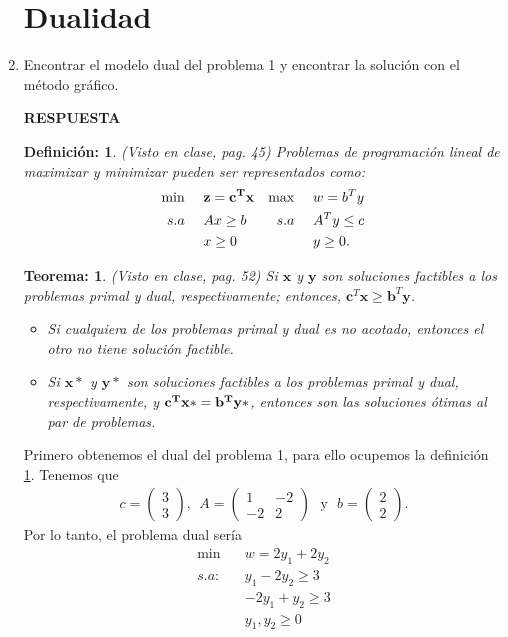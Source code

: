 \documentclass[11pt,letterpaper]{article}
\newcommand{\x}{\mathbf{x}}
\newcommand{\res}{\textbf{RESPUESTA}\\}
\newtheorem{thmt}{Teorema:}
\newtheorem{thmd}{Definición:}
\begin{document}
\begin{enumerate}
\section{Dualidad}

\item Encontrar el modelo  dual del problema 1 y encontrar la solución con el método gráfico.

\res \begin{framed}
    \begin{thmd} \label{d_dual}
	(Visto en clase, pag. 45) Problemas de programación lineal de maximizar y minimizar pueden ser representados como:
	\begin{align*}
	\min\ \ \ \ & \bf z=c^T \x &  \max\ \ \ \ & w=b^Ty\\
	s.a\ \ \ \ & Ax\geq b &  s.a\ \ \ \ & A^T y\leq c\\
	& x\geq 0 & &  y\geq 0.
	\end{align*}
    \end{thmd}
\end{framed}
\begin{framed}
    \begin{thmt} \label{t_dual_debil}
	(Visto en clase, pag. 52) Si $\x$ y $\mathbf{y}$ son soluciones factibles a los problemas primal y dual, respectivamente; entonces, $\mathbf{c}^T \x \geq \mathbf{b}^T \mathbf{y}$.
	\begin{itemize}
	\item Si cualquiera de los problemas primal y dual es no acotado, entonces el otro no tiene solución factible.
	\item Si $\x*$ y $\mathbf{y}*$  son soluciones factibles a los problemas primal y dual, respectivamente, y $\bf c^T x*=b^Ty*$, entonces son las soluciones ótimas al par de problemas. 
	\end{itemize}
    \end{thmt}
\end{framed}


Primero obtenemos el dual del problema 1, para ello ocupemos la definición \ref{d_dual}. Tenemos que 
\begin{align*}
c=\begin{pmatrix}
3 \\ 3
\end{pmatrix} , \ \ A=\begin{pmatrix}
1 & -2 \\
-2 & 2
\end{pmatrix} \ \ \ \text{y} \ \ \ b=\begin{pmatrix}
2\\
2
\end{pmatrix}.
\end{align*}
Por lo tanto, el problema dual sería
\begin{align*}
\min \ \ \ \ & w=2y_1+2y_2\\
s.a:\ \ \ \ & y_1-2y_2 \geq 3\\
	 & -2y_1+y_2\geq 3\\
	 &y_1,y_2 \geq 0
\end{align*}


\end{enumerate}
\end{document}
